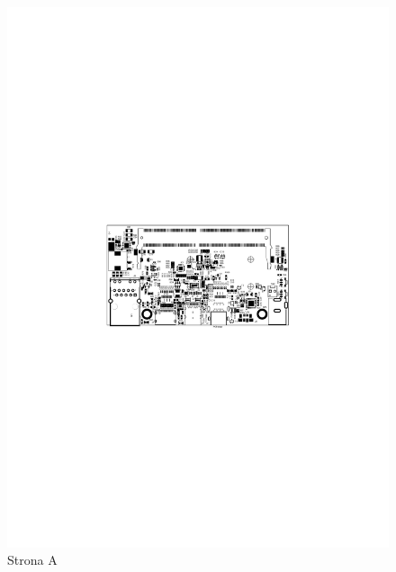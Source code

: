 \begin{figure}[!htb]
	\begin{minipage}{0.5\textwidth}
		\centering
		\includegraphics[width=0.95\linewidth,clip, trim=5.5cm 12cm 5.5cm 11cm]{./chapters/chapter5/Jetson_A.pdf}
		\caption{Strona A}\label{chilli:StronaA}
	\end{minipage}\hfill
	\begin{minipage}{0.5\textwidth}
		\centering

\end{minipage}
\end{figure}

